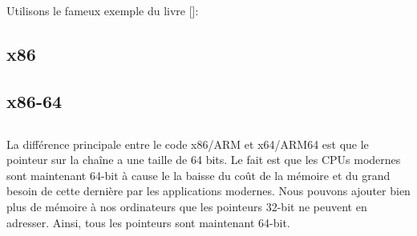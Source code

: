 \mysection{\HelloWorldSectionName}
\label{sec:helloworld}

Utilisons le fameux exemple du livre [\KRBook]:



\subsection{x86}





\subsection{x86-64}








\subsection{\Conclusion{}}

La différence principale entre le code x86/ARM et x64/ARM64 est que le pointeur sur la chaîne a une taille de 64 bits.
Le fait est que les \ac{CPU}s modernes sont maintenant 64-bit à cause le la baisse du coût de la mémoire et du grand
besoin de cette dernière par les applications modernes.
Nous pouvons ajouter bien plus de mémoire à nos ordinateurs que les pointeurs 32-bit ne peuvent en adresser.
Ainsi, tous les pointeurs sont maintenant 64-bit.



